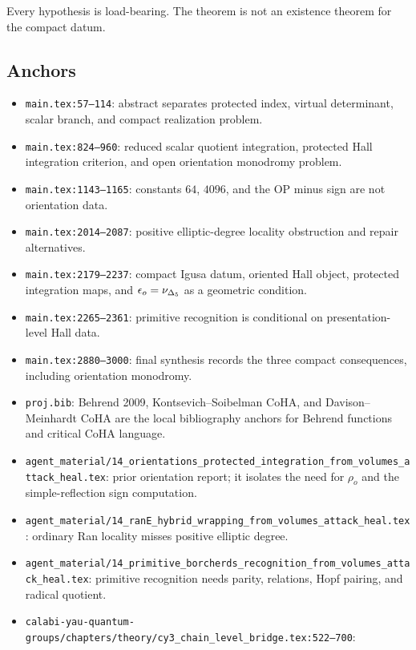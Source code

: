 Every hypothesis is load-bearing.  The theorem is not an existence
theorem for the compact datum.

\subsection{Anchors}

\begin{itemize}
\item \texttt{main.tex:57--114}: abstract separates protected index,
virtual determinant, scalar branch, and compact realization problem.
\item \texttt{main.tex:824--960}: reduced scalar quotient integration,
protected Hall integration criterion, and open orientation monodromy
problem.
\item \texttt{main.tex:1143--1165}: constants \(64\), \(4096\), and the
OP minus sign are not orientation data.
\item \texttt{main.tex:2014--2087}: positive elliptic-degree
locality obstruction and repair alternatives.
\item \texttt{main.tex:2179--2237}: compact Igusa datum, oriented Hall
object, protected integration maps, and \(\epsilon_o=\nu_{\Delta_5}\) as a
geometric condition.
\item \texttt{main.tex:2265--2361}: primitive recognition is conditional
on presentation-level Hall data.
\item \texttt{main.tex:2880--3000}: final synthesis records the three
compact consequences, including orientation monodromy.
\item \texttt{proj.bib}: Behrend 2009, Kontsevich--Soibelman CoHA, and
Davison--Meinhardt CoHA are the local bibliography anchors for
Behrend functions and critical CoHA language.
\item
\texttt{agent\_material/14\_orientations\_protected\_integration\_from\_volumes\_attack\_heal.tex}:
prior orientation report; it isolates the need for \(\rho_o\) and the
simple-reflection sign computation.
\item
\texttt{agent\_material/14\_ranE\_hybrid\_wrapping\_from\_volumes\_attack\_heal.tex}:
ordinary Ran locality misses positive elliptic degree.
\item
\texttt{agent\_material/14\_primitive\_borcherds\_recognition\_from\_volumes\_attack\_heal.tex}:
primitive recognition needs parity, relations, Hopf pairing, and
radical quotient.
\item
\texttt{calabi-yau-quantum-groups/chapters/theory/cy3\_chain\_level\_bridge.tex:522--700}:

\end{itemize}
